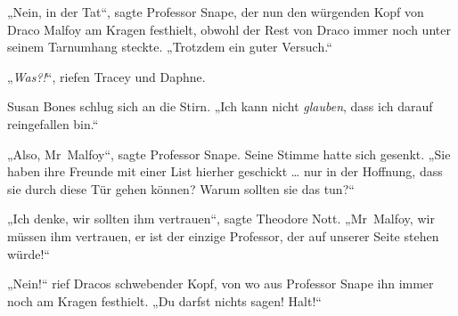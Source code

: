 „Nein, in der Tat“, sagte Professor Snape, der nun den würgenden Kopf von Draco Malfoy am Kragen festhielt, obwohl der Rest von Draco immer noch unter seinem Tarnumhang steckte.
„Trotzdem ein guter Versuch.“

„\emph{Was?!}“, riefen Tracey und Daphne.

Susan Bones schlug sich an die Stirn.
„Ich kann nicht \emph{glauben}, dass ich darauf reingefallen bin.“

„Also, Mr~Malfoy“, sagte Professor Snape. Seine Stimme hatte sich gesenkt.
„Sie haben ihre Freunde mit einer List hierher geschickt … nur in der Hoffnung, dass sie durch diese Tür gehen können? Warum sollten sie das tun?“

„Ich denke, wir sollten ihm vertrauen“, sagte Theodore Nott.
„Mr~Malfoy, wir müssen ihm vertrauen, er ist der einzige Professor, der auf unserer Seite stehen würde!“

„Nein!“ rief Dracos schwebender Kopf, von wo aus Professor Snape ihn immer noch am Kragen festhielt.
„Du darfst nichts sagen! Halt!“

